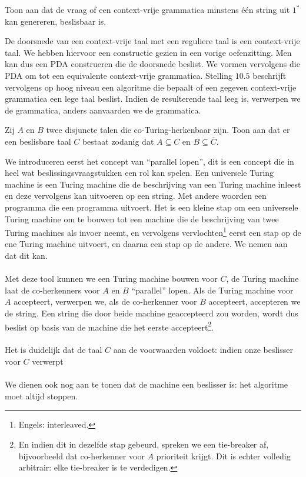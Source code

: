 \documentclass[a4paper]{article}
\begin{document}
\begin{question}
Toon aan dat de vraag of een context-vrije grammatica minstens \'e\'en string uit $1^*$ kan genereren, beslisbaar is.
\begin{answer}
De doorsnede van een context-vrije taal met een reguliere taal is een context-vrije taal. We hebben hiervoor een constructie gezien in een vorige oefenzitting. Men kan dus een PDA construeren die de doorsnede beslist. We vormen vervolgens die PDA om tot een equivalente context-vrije grammatica. Stelling $10.5$ beschrijft vervolgens op hoog niveau een algoritme die bepaalt of een gegeven context-vrije grammatica een lege taal beslist. Indien de resulterende taal leeg is, verwerpen we de grammatica, anders aanvaarden we de grammatica.
\end{answer}
\end{question}

\begin{question}
Zij $A$ en $B$ twee disjuncte talen die co-Turing-herkenbaar zijn. Toon aan dat er een beslisbare taal $C$ bestaat zodanig dat $A \subseteq C$ en $B \subseteq \overline{C}$.
\begin{answer}
We introduceren eerst het concept van ``parallel lopen'', dit is een concept die in heel wat beslissingsvraagstukken een rol kan spelen. Een universele Turing machine is een Turing machine die de beschrijving van een Turing machine inleest en deze vervolgens kan uitvoeren op een string. Met andere woorden een programma die een programma uitvoert. Het is een kleine stap om een universele Turing machine om te bouwen tot een machine die de beschrijving van twee Turing machines als invoer neemt, en vervolgens vervlochten\footnote{Engels: interleaved.} eerst een stap op de ene Turing machine uitvoert, en daarna een stap op de andere. We nemen aan dat dit kan.
\paragraph{}
Met deze tool kunnen we een Turing machine bouwen voor $C$, de Turing machine laat de co-herkenners voor $A$ en $B$ ``parallel'' lopen. Als de Turing machine voor $A$ accepteert, verwerpen we, als de co-herkenner voor $B$ accepteert, accepteren we de string. Een string die door beide machine geaccepteerd zou worden, wordt dus beslist op basis van de machine die het eerste accepteert\footnote{En indien dit in dezelfde stap gebeurd, spreken we een tie-breaker af, bijvoorbeeld dat co-herkenner voor $A$ prioriteit krijgt. Dit is echter volledig arbitrair: elke tie-breaker is te verdedigen.}.
\paragraph{}
Het is duidelijk dat de taal $C$ aan de voorwaarden voldoet: indien onze beslisser voor $C$ verwerpt 
\paragraph{}
We dienen ook nog aan te tonen dat de machine een beslisser is: het algoritme moet altijd stoppen. 
\end{answer}
\end{question}
\end{document}
